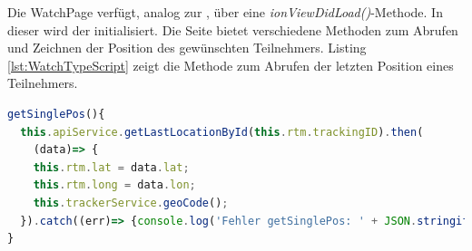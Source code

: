 Die WatchPage verfügt, analog zur , über eine \emph{ionViewDidLoad()}-Methode. In dieser wird der  initialisiert. 
Die Seite bietet verschiedene Methoden zum Abrufen und Zeichnen der Position des gewünschten Teilnehmers. Listing \ref{lst:WatchTypeScript} zeigt die Methode zum Abrufen der letzten Position eines Teilnehmers.



\begin{lstlisting}[float, language=JavaScript, caption=Methode zum Abruf der letzten Position , label=lst:WatchTypeScript]
getSinglePos(){
  this.apiService.getLastLocationById(this.rtm.trackingID).then(
    (data)=> {
    this.rtm.lat = data.lat;
    this.rtm.long = data.lon;
    this.trackerService.geoCode();
  }).catch((err)=> {console.log('Fehler getSinglePos: ' + JSON.stringify(err))});
}
\end{lstlisting}


